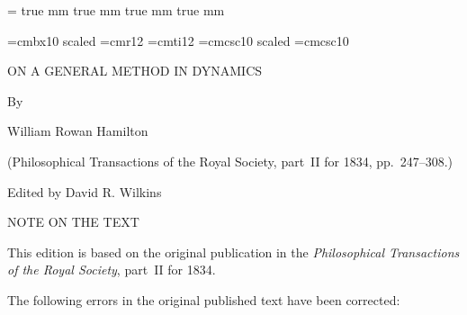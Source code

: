 %

\magnification=
 true mm  true mm
    true mm  true mm

\def\folio{\ifnum\pageno>0 \number\pageno \else
   \ifnum\pageno<0 \romannumeral-\pageno \else\fi\fi}

\font\Largebf=cmbx10  scaled 
\font\largerm=cmr12
\font\largeit=cmti12
\font\largesc=cmcsc10  scaled 
\font\sc=cmcsc10

\def\multieqalign#1{\null\,\vcenter{\openup1\jot \mathsurround=0pt
   \ialign{\strut\hfil$\displaystyle{##}$&$\displaystyle{{}##}$\hfil
   &&\quad \strut\hfil$\displaystyle{##}$&$\displaystyle{{}##}$\hfil
    \crcr#1\crcr}}\,}

\def\sum{\mathop{\Sigma}\nolimits}

\def\sectiontitle{\it\noindent}


\null\vskip72pt

\centerline{\Largebf ON A GENERAL METHOD IN DYNAMICS}

\vskip24pt

\centerline{\Largebf By}

\vskip24pt

\centerline{\Largebf William Rowan Hamilton}

\vskip24pt

\centerline{\largerm (Philosophical Transactions of the Royal Society,
   part~II for 1834, pp.\ 247--308.)}

\vskip36pt

\vfill

\centerline{\largerm Edited by David R. Wilkins}

\vskip 12pt

\centerline{}

\vskip36pt\eject


\null\vskip36pt

\centerline{\Largebf NOTE ON THE TEXT}

\bigskip

This edition is based on the original publication in the {\it
Philosophical Transactions of the Royal Society}, part~II for
1834.


The following errors in the original published text have been
corrected:

